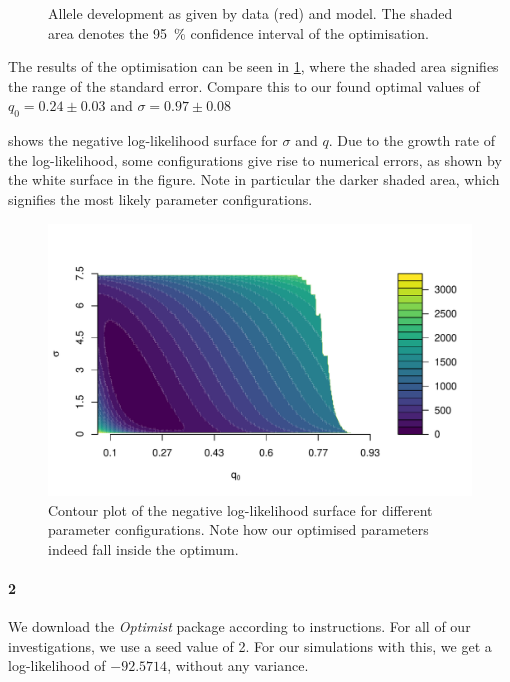 \documentclass[10pt]{article}\usepackage[]{graphicx}\usepackage[]{color}
\makeatletter
\def\maxwidth{ %
  \ifdim\Gin@nat@width>\linewidth
    \linewidth
  \else
    \Gin@nat@width
  \fi
}
\theoremstyle{plain}
\makeatother
\begin{document}
\begin{multicols*}{2}
\begin{Schunk}
\begin{figure}[H]
{}

\caption[Allele development as given by data (red) and model]{Allele development as given by data (red) and model. The shaded area denotes the 95~\% confidence interval of the optimisation.}\label{fig:1_inference}
\end{figure}
\end{Schunk}
The results of the optimisation can be seen in \cref{fig:1_inference}, where the shaded area signifies the range of the standard error.  Compare this to our found optimal values of 
$q_0 = 0.24 \pm 0.03$ and
$\sigma = 0.97 \pm 0.08$

 shows the negative log-likelihood surface for $\sigma$ and $q$. Due to the growth rate of the log-likelihood, some configurations give rise to numerical errors, as shown by the white surface in the figure. Note in particular the darker shaded area, which signifies the most likely parameter configurations. 
\begin{Schunk}
\begin{figure}[H]

{\centering \includegraphics[width=\maxwidth]{figure/twocolumn-1_surface-1} 

}

\caption[Contour plot of the negative log-likelihood surface for different parameter configurations]{Contour plot of the negative log-likelihood surface for different parameter configurations. Note how our optimised parameters indeed fall inside the optimum.}\label{fig:1_surface}
\end{figure}
\end{Schunk}

\paragraph*{2}
We download the \textit{Optimist} package according to instructions. For all of our investigations, we use a seed value of 2. For our simulations with this, we get a log-likelihood of $-92.5714$, without any variance. 




\end{multicols*}
\end{document}
